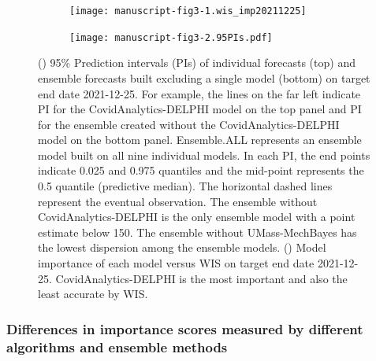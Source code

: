 \documentclass{article}
\theoremstyle{definition}
\begin{document}
\begin{figure}
\centering
\begin{subfigure}{\textwidth}
	\subcaption{}
\texttt{[image: manuscript-fig3-1.wis\_imp20211225]}

\label{fig:plot-wis_imp20211225}
\end{subfigure}\par
\begin{subfigure}{\textwidth}
	\subcaption{}
	\texttt{[image: manuscript-fig3-2.95PIs.pdf]}
		\label{fig:PIs2021}
\end{subfigure}
\caption{() 95\% Prediction intervals (PIs) of individual forecasts (top) and ensemble forecasts built excluding a single model (bottom) on target end date 2021-12-25. For example, the lines on the far left indicate PI for the CovidAnalytics-DELPHI model on the top panel and PI for the ensemble created without the CovidAnalytics-DELPHI model on the bottom panel. Ensemble.ALL represents an ensemble model built on all nine individual models. In each PI, the  end points indicate 0.025 and 0.975 quantiles and the mid-point represents the 0.5 quantile (predictive median). The horizontal dashed lines represent the eventual observation. The ensemble without CovidAnalytics-DELPHI is the only ensemble model with a point estimate below 150. The ensemble without UMass-MechBayes has the lowest dispersion
among the ensemble models. () Model importance of each model versus WIS on target end date 2021-12-25. CovidAnalytics-DELPHI is the most important and also the least accurate by WIS.}
\label{fig:20211225}
\end{figure}



\newpage
\subsubsection{Differences in importance scores measured by different algorithms and ensemble methods}
\end{document}
